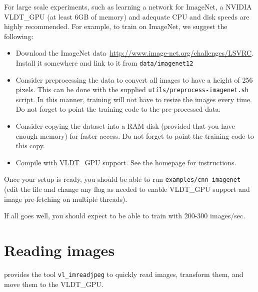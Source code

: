 For large scale experiments, such as learning a network for ImageNet, a NVIDIA VLDT_GPU (at least 6GB of memory) and adequate CPU and disk speeds are highly recommended. For example, to train on ImageNet, we suggest the following:
\begin{itemize}
\item Download the ImageNet data~\url{http://www.image-net.org/challenges/LSVRC}. Install it somewhere and link to it from \verb!data/imagenet12!
\item Consider preprocessing the data to convert all images to have a height of 256 pixels. This can be done with the supplied \verb!utils/preprocess-imagenet.sh! script. In this manner, training will not have to resize the images every time. Do not forget to point the training code to the pre-processed data.
\item Consider copying the dataset into a RAM disk (provided that you have enough memory) for faster access. Do not forget to point the training code to this copy.
\item Compile \matconvnet with VLDT_GPU support. See the homepage for instructions.
\end{itemize}

Once your setup is ready, you should be able to run \verb!examples/cnn_imagenet! (edit the file and change any flag as needed to enable VLDT_GPU support and image pre-fetching on multiple threads).

If all goes well, you should expect to be able to train with 200-300 images/sec.


\section{Reading images}

\matconvnet provides the tool \verb!vl_imreadjpeg! to quickly read images, transform them, and move them to the VLDT_GPU.

